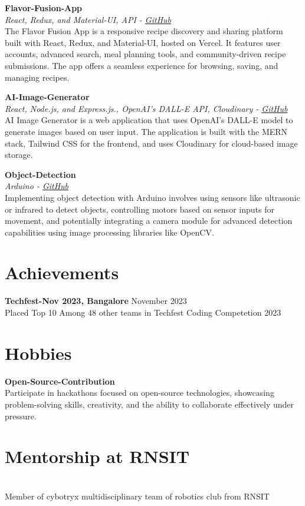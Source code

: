 \documentclass[a4paper,10pt]{article}
\begin{document}
\vspace{0.3em}
\textbf{Flavor-Fusion-App} \\
\textit{ React, Redux, and Material-UI, API - \href{https://github.com/spriyanshucoder/FlavorFusion-App}{GitHub}} \\
The Flavor Fusion App is a responsive recipe discovery and sharing platform built with React, Redux, and Material-UI, hosted on Vercel. It features user accounts, advanced search, meal planning tools, and community-driven recipe submissions. The app offers a seamless experience for browsing, saving, and managing recipes.

\vspace{0.3em}
\textbf{AI-Image-Generator} \\
\textit{React, Node.js, and Express.js., OpenAI's DALL-E  API, Cloudinary - \href{https://github.com/spriyanshucoder/AI-IMAGE-GENERATOR.}{GitHub}} \\
AI Image Generator is a web application that uses OpenAI's DALL-E model to generate images based on user input. The application is built with the MERN stack, Tailwind CSS for the frontend, and uses Cloudinary for cloud-based image storage.

\vspace{0.3em}
\textbf{Object-Detection} \\
\textit{Arduino - \href{https://github.com/spriyanshucoder}{GitHub}} \\
Implementing object detection with Arduino involves using sensors like ultrasonic or infrared to detect objects, controlling motors based on sensor inputs for movement, and potentially integrating a camera module for advanced detection capabilities using image processing libraries like OpenCV.

\section*{Achievements}
\textbf{Techfest-Nov 2023, Bangalore} \hfill November 2023 \\
Placed Top 10 Among 48 other teams in Techfest Coding Competetion 2023


\section*{Hobbies}
\textbf{Open-Source-Contribution} \\
Participate in hackathons focused on open-source technologies, showcasing problem-solving skills, creativity, and the ability to collaborate effectively under pressure.

\section*{Mentorship at RNSIT} \\
Member of cybotryx multidisciplinary team of
robotics club from RNSIT
\end{document}

